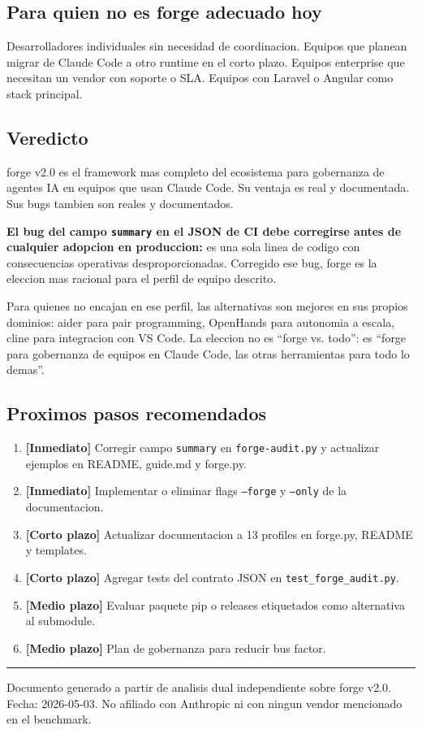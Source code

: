 \documentclass[12pt,a4paper]{article}
\begin{document}
\subsection{Para quien no es forge adecuado hoy}

Desarrolladores individuales sin necesidad de coordinacion. Equipos que planean migrar
de Claude Code a otro runtime en el corto plazo. Equipos enterprise que necesitan un
vendor con soporte o SLA. Equipos con Laravel o Angular como stack principal.

\subsection{Veredicto}

forge v2.0 es el framework mas completo del ecosistema para gobernanza de agentes IA
en equipos que usan Claude Code. Su ventaja es real y documentada. Sus bugs tambien son
reales y documentados.

\textbf{\textcolor{criticalred}{El bug del campo \texttt{summary} en el JSON de CI
debe corregirse antes de cualquier adopcion en produccion:}} es una sola linea de codigo
con consecuencias operativas desproporcionadas. Corregido ese bug, forge es la eleccion
mas racional para el perfil de equipo descrito.

Para quienes no encajan en ese perfil, las alternativas son mejores en sus propios
dominios: aider para pair programming, OpenHands para autonomia a escala, cline para
integracion con VS Code. La eleccion no es ``forge vs. todo'': es ``forge para
gobernanza de equipos en Claude Code, las otras herramientas para todo lo demas''.

\subsection{Proximos pasos recomendados}

\begin{enumerate}
  \item \textbf{[Inmediato]} Corregir campo \texttt{summary} en \texttt{forge-audit.py}
    y actualizar ejemplos en README, guide.md y forge.py.
  \item \textbf{[Inmediato]} Implementar o eliminar flags \texttt{--forge} y
    \texttt{--only} de la documentacion.
  \item \textbf{[Corto plazo]} Actualizar documentacion a 13 profiles en forge.py,
    README y templates.
  \item \textbf{[Corto plazo]} Agregar tests del contrato JSON en
    \texttt{test\_forge\_audit.py}.
  \item \textbf{[Medio plazo]} Evaluar paquete pip o releases etiquetados como
    alternativa al submodule.
  \item \textbf{[Medio plazo]} Plan de gobernanza para reducir bus factor.
\end{enumerate}

\vspace{1cm}
\hrule
\vspace{0.5cm}
{\small\color{titlegray}
Documento generado a partir de analisis dual independiente sobre forge v2.0.
Fecha: 2026-05-03. No afiliado con Anthropic ni con ningun vendor mencionado en el benchmark.
}
\end{document}
